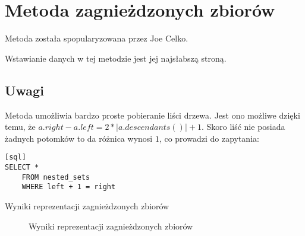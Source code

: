 \section{Metoda zagnieżdzonych zbiorów}

Metoda została spopularyzowana przez Joe Celko\cite{celko-sql}.






Wstawianie danych w tej metodzie jest jej najsłabszą stroną.








\subsection{Uwagi}

Metoda umożliwia bardzo proste pobieranie liści drzewa. 
Jest ono możliwe dzięki temu, że $a.right - a.left = 2 * |a.descendants()| + 1$. 
Skoro liść nie posiada żadnych potomków to da różnica wynosi $1$, co prowadzi do zapytania: 
\begin{verbatim}[sql]
SELECT *
    FROM nested_sets
    WHERE left + 1 = right
\end{verbatim}


\begin{table}[h!]
  \caption{Wyniki reprezentacji zagnieżdzonych zbiorów}
   \begin{center}
   \end{center}
\end{table}

\begin{figure}[h!t]
  \caption{Wyniki reprezentacji zagnieżdzonych zbiorów}
  \label{fig:img_chart_nested}
  \begin{center}
  \end{center}
\end{figure}

